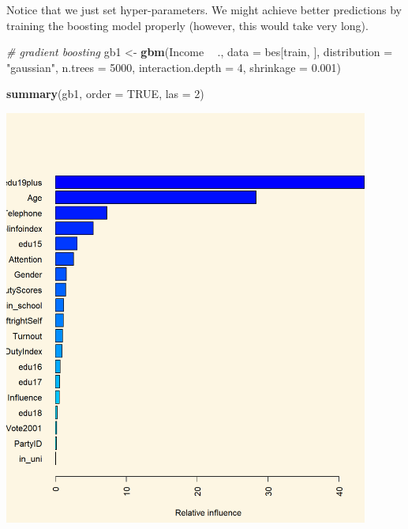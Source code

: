 \documentclass[]{article}
\newenvironment{Shaded}{\begin{snugshade}}{\end{snugshade}}
\newcommand{\CommentTok}[1]{\textcolor[rgb]{0.56,0.35,0.01}{\textit{#1}}}
\newcommand{\DataTypeTok}[1]{\textcolor[rgb]{0.13,0.29,0.53}{#1}}
\newcommand{\DecValTok}[1]{\textcolor[rgb]{0.00,0.00,0.81}{#1}}
\newcommand{\FloatTok}[1]{\textcolor[rgb]{0.00,0.00,0.81}{#1}}
\newcommand{\KeywordTok}[1]{\textcolor[rgb]{0.13,0.29,0.53}{\textbf{#1}}}
\newcommand{\NormalTok}[1]{#1}
\newcommand{\OperatorTok}[1]{\textcolor[rgb]{0.81,0.36,0.00}{\textbf{#1}}}
\newcommand{\OtherTok}[1]{\textcolor[rgb]{0.56,0.35,0.01}{#1}}
\newcommand{\StringTok}[1]{\textcolor[rgb]{0.31,0.60,0.02}{#1}}
\begin{document}
Notice that we just set hyper-parameters. We might achieve better predictions by training the boosting model properly (however, this would take very long).

\begin{Shaded}
\begin{Highlighting}[]
\CommentTok{# gradient boosting}
\NormalTok{gb1 <-}\StringTok{ }\KeywordTok{gbm}\NormalTok{(Income }\OperatorTok{~}\StringTok{ }\NormalTok{., }\DataTypeTok{data =}\NormalTok{ bes[train, ], }
           \DataTypeTok{distribution =} \StringTok{"gaussian"}\NormalTok{, }
           \DataTypeTok{n.trees =} \DecValTok{5000}\NormalTok{, }
           \DataTypeTok{interaction.depth =} \DecValTok{4}\NormalTok{,}
           \DataTypeTok{shrinkage =} \FloatTok{0.001}\NormalTok{)}

\KeywordTok{summary}\NormalTok{(gb1, }\DataTypeTok{order =} \OtherTok{TRUE}\NormalTok{, }\DataTypeTok{las =} \DecValTok{2}\NormalTok{)}
\end{Highlighting}
\end{Shaded}

\includegraphics[width=0.9\textwidth,height=\textheight]{./img/unnamed-chunk-165-1.png}
\end{document}
